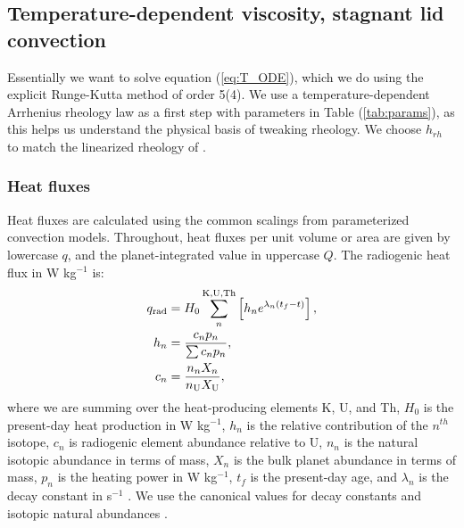 \subsection{Temperature-dependent viscosity, stagnant lid convection}\label{sec:viscosity-model}

Essentially we want to solve equation (\ref{eq:T_ODE}), which we do using the explicit Runge-Kutta method of order 5(4).
We use a temperature-dependent Arrhenius rheology law \citep{Karato1993} as a first step with parameters in Table (\ref{tab:params}), as this helps us understand the physical basis of tweaking rheology. We choose $h_{rh}$ to match the linearized rheology of \citet{Thiriet2019}.

\subsubsection{Heat fluxes}
Heat fluxes are calculated using the common scalings from parameterized convection models. Throughout, heat fluxes per unit volume or area are given by lowercase $q$, and the planet-integrated value in uppercase $Q$. The radiogenic heat flux in W kg$^{-1}$ is:
\begin{align}
q_{\rm rad} &= H_0\sum^{\rm K, U, Th}_n \left[ h_{n}  e^{\lambda_n (t_f - t)} \right], \nonumber \\
h_n &= \frac{c_n p_n}{\sum c_n p_n}, \\
c_n &= \frac{n_nX_n}{n_{\rm U} X_{\rm U}} \nonumber ,
\end{align}
where we are summing over the heat-producing elements K, U, and Th, $H_{0}$ is the present-day heat production in W kg$^{-1}$, $h_n$ is the relative contribution of the $n^{th}$ isotope, $c_n$ is radiogenic element abundance relative to U, $n_n$ is the natural isotopic abundance in terms of mass, $X_n$ is the bulk planet abundance in terms of mass, $p_n$ is the heating power in W kg$^{-1}$, $t_f$ is the present-day age, and $\lambda_n$ is the decay constant in s$^{-1}$ \citep{Korenaga2006}. We use the canonical values for decay constants and isotopic natural abundances \citep{Jaupart2015}.


